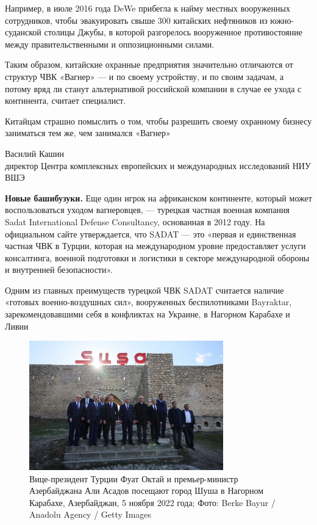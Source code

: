 Например, в июле 2016 года DeWe прибегла к найму местных вооруженных сотрудников, чтобы эвакуировать свыше 300 китайских нефтяников из южно-суданской столицы Джубы, в которой разгорелось вооруженное противостояние между правительственными и оппозиционными силами.

Таким образом, китайские охранные предприятия значительно отличаются от структур ЧВК «Вагнер» — и по своему устройству, и по своим задачам, а потому вряд ли станут альтернативой российской компании в случае ее ухода с континента, считает специалист.

\begin{fancyquotes}
    Китайцам страшно помыслить о том, чтобы разрешить своему охранному бизнесу заниматься тем же, чем занимался «Вагнер»

    \begin{flushright}
        Василий Кашин\\
        директор Центра комплексных европейских и международных исследований НИУ ВШЭ
    \end{flushright}
\end{fancyquotes}

\textbf{Новые башибузуки.} Еще один игрок на африканском континенте, который может воспользоваться уходом вагнеровцев, — турецкая частная военная компания Sadat International Defense Consultancy, основанная в 2012 году. На официальном сайте утверждается, что SADAT — это «первая и единственная частная ЧВК в Турции, которая на международном уровне предоставляет услуги консалтинга, военной подготовки и логистики в секторе международной обороны и внутренней безопасности».

\begin{center}
    \Large
    Одним из главных преимуществ турецкой ЧВК SADAT считается наличие «готовых военно-воздушных сил», вооруженных беспилотниками Bayraktar, зарекомендовавшими себя в конфликтах на Украине, в Нагорном Карабахе и Ливии
\end{center}

\begin{figure}[h]
    \centering
    \includegraphics[width=0.75\textwidth]{img/pmc_africa_7.jpg}
    \caption{Вице-президент Турции Фуат Октай и премьер-министр Азербайджана Али Асадов посещают город Шуша в Нагорном Карабахе, Азербайджан, 5 ноября 2022 года; Фото: Berke Bayur / Anadolu Agency / Getty Images}
\end{figure}


